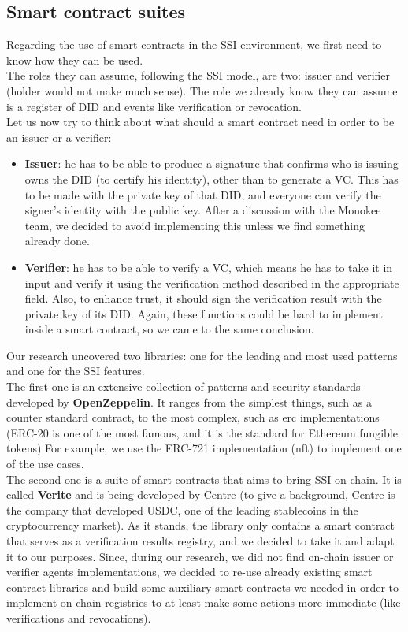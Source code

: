 \subsection{Smart contract suites}
Regarding the use of smart contracts in the SSI environment, we first need to know how they 
can be used.\\
The roles they can assume, following the SSI model, are two: issuer and verifier (holder 
would not make much sense). The role we already know they can assume is a register of DID 
and events like verification or revocation.
\vspace{0.3cm}\\
Let us now try to think about what should a smart contract need in order to be an issuer or 
a verifier:
\begin{itemize}
    \item \textbf{Issuer}: he has to be able to produce a signature that confirms who is 
    issuing owns the DID (to certify his identity), other than to generate a VC.
    This has to be made with the private key of that DID, and everyone can verify the signer's 
    identity with the public key. After a discussion with the Monokee team, we decided to 
    avoid implementing this unless we find something already done.
    \item \textbf{Verifier}: he has to be able to verify a VC, which means he has to take it 
    in input and verify it using the verification method described in the appropriate field. 
    Also, to enhance trust, it should sign the verification result with the private key of 
    its DID. Again, these functions could be hard to implement inside a smart contract, so we 
    came to the same conclusion.
\end{itemize}
Our research uncovered two libraries: one for the leading and most used patterns and one 
for the SSI features.\\
The first one is an extensive collection of patterns and security standards developed by 
\textbf{OpenZeppelin}\cite{site:openzeppelin}. It ranges from the simplest things, such as a counter standard contract, to 
the most complex, such as \acrfull{erc} implementations (ERC-20 is 
one of the most famous, and it is the standard for Ethereum fungible tokens)
For example, we use the ERC-721 implementation (\acrfull{nft}) to 
implement one of the use cases.\\
The second one is a suite of smart contracts that aims to bring SSI on-chain. It is called 
\textbf{Verite}\cite{site:verite} and is being developed by Centre (to give a background, Centre is the company
that developed USDC, one of the leading stablecoins in the cryptocurrency market).
As it stands, the library only contains a smart contract that serves as a verification 
results registry, and we decided to take it and adapt it to our purposes.
\clearpage
Since, during our research, we did not find on-chain issuer or verifier agents implementations,  
we decided to re-use already existing smart contract libraries and build some
auxiliary smart contracts we needed in order to implement on-chain registries to at least 
make some actions more immediate (like verifications and revocations).
